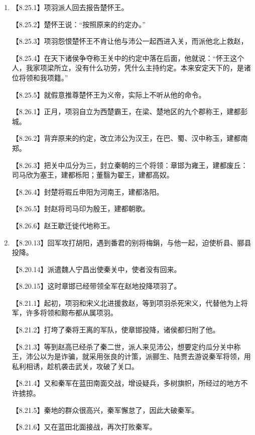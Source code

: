 \documentclass[fontset=none,11pt,a4paper]{ctexart}
\begin{document}
\begin{enumerate}[label=\Alph*.]
  \item
\noindent 【8.25.1】项羽派人回去报告楚怀王。\par
\noindent 【8.25.2】楚怀王说：“按照原来的约定办。”\par
\noindent 【8.25.3】项羽怨恨楚怀王不肯让他与沛公一起西进入关，而派他北上救赵，\par
\noindent 【8.25.4】在天下诸侯争夺称王关中的约定中落在后面，他就说：“怀王这个人，我家项梁所立，没有什么功劳，凭什么主持约定。本来安定天下的，是诸位将领和我项籍。”\par
\noindent 【8.25.5】就假意推尊楚怀王为义帝，实际上不听从他的命令。\par
\noindent 【8.26.1】正月，项羽自立为西楚霸王，在梁、楚地区的九个郡称王，建都彭城。\par
\noindent 【8.26.2】背弃原来的约定，改立沛公为汉王，在巴、蜀、汉中称玉，建都南郑。\par
\noindent 【8.26.3】把关中瓜分为三，封立秦朝的三个将领：章邯为雍王，建都废丘：司马欣为塞王，建都栎阳；董翳为翟王，建都高奴。\par
\noindent 【8.26.4】封楚将瑕丘申阳为河南王，建都洛阳。\par
\noindent 【8.26.5】封赵将司马印为殷王，建都朝歌。\par
\noindent 【8.26.6】赵王歇迁徙代地称王。\par
  \item
\noindent 【8.20.13】回军攻打胡阳，遇到番君的别将梅鋗，与他一起，迫使析县、郦县投降。\par
\noindent 【8.20.14】派遣魏人宁昌出使秦关中，使者没有回来。\par
\noindent 【8.20.15】这时章邯已经带领全军在赵地投降项羽了。\par
\noindent 【8.21.1】起初，项羽和宋义北进援救赵，等到项羽杀死宋义，代替他为上将军，许多将领和黥布都从属项羽。\par
\noindent 【8.21.2】打垮了秦将王离的军队，使章邯投降，诸侯都归附了他。\par
\noindent 【8.21.3】等到赵高已经杀了秦二世，派人来见沛公，想要定约瓜分关中称王，沛公以为是诈骗，就采用张良的计策，派郦生、陆贾去游说秦军将领，用私利相诱，趁机袭击武关，攻破了关口。\par
\noindent 【8.21.4】又和秦军在蓝田南面交战，增设疑兵，多树旗帜，所经过的地方不许掳掠。\par
\noindent 【8.21.5】秦地的群众很高兴，秦军懈怠了，因此大破秦军。\par
\noindent 【8.21.6】又在蓝田北面接战，再次打败秦军。\par

\end{enumerate}
\end{document}
